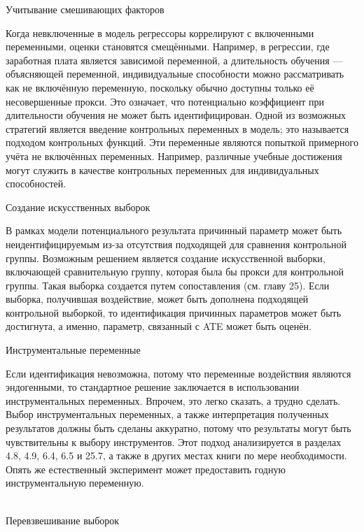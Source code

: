 \begin{center}
Учитывание смешивающих факторов
\end{center}


Когда невключенные в модель регрессоры коррелируют с включенными переменными, оценки становятся смещёнными. Например, в регрессии, где заработная плата является зависимой переменной, а длительность обучения --- объясняющей переменной, индивидуальные способности можно рассматривать как не включённую переменную, поскольку обычно доступны только её несовершенные прокси. Это означает, что потенциально коэффициент при длительности обучения не может быть идентифицирован. Одной из возможных стратегий является введение контрольных переменных в модель; это называется подходом контрольных функций. Эти переменные являются попыткой примерного учёта не включённых переменных. Например, различные учебные достижения могут служить в качестве контрольных переменных для индивидуальных способностей.



\begin{center}
Создание искусственных выборок
\end{center}


В рамках модели потенциального результата причинный параметр  может быть неидентифицируемым из-за отсутствия подходящей для сравнения контрольной группы. Возможным решением является создание искусственной выборки, включающей сравнительную группу, которая была бы прокси для контрольной группы. Такая выборка создается путем сопоставления (см. главу 25). Если выборка, получившая воздействие, может быть дополнена подходящей контрольной выборкой, то идентификация причинных параметров может быть достигнута, а именно, параметр, связанный с ATE может быть оценён.


\begin{center}
Инструментальные переменные
\end{center}


Если идентификация невозможна, потому что переменные воздействия являются эндогенными, то стандартное решение заключается в использовании инструментальных переменных. Впрочем, это легко сказать, а трудно сделать. Выбор инструментальных переменных, а также интерпретация полученных результатов должны быть сделаны аккуратно, потому что результаты могут быть чувствительны к выбору инструментов. Этот подход анализируется в разделах 4.8, 4.9, 6.4, 6.5 и 25.7, а также в других местах книги по мере необходимости. Опять же естественный эксперимент может предоставить годную инструментальную переменную.
\\
\\
\begin{center}
Перевзвешивание выборок
\end{center}


